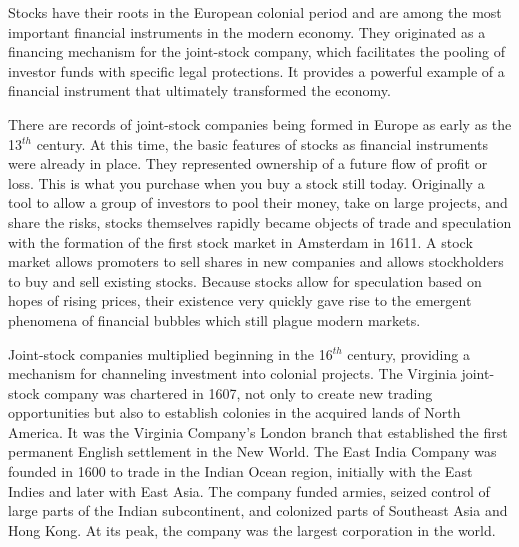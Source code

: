 Stocks have their roots in the European colonial period and are among the most important financial instruments in the modern economy. %
They originated as a financing mechanism for the \gls{joint-stock company},  
which facilitates the pooling of investor funds with specific legal protections. It provides a powerful example of a financial instrument that ultimately transformed the economy. 

There are records of joint-stock companies being formed in Europe as early as the 13$^{th}$ century. At this time, the basic features of stocks as financial instruments were already in place. They represented ownership of a future flow of profit or loss. This is what you purchase when you buy a stock still today. Originally a tool to allow a group of investors to pool their money, take on large projects, and share the risks, stocks themselves rapidly became objects of trade and speculation with the formation of the first stock market in Amsterdam in 1611. 
A stock market allows promoters to sell shares in new companies and allows stockholders to buy and sell existing stocks. 
Because stocks allow for speculation based on hopes of rising prices, their existence very quickly gave rise to the emergent phenomena of financial bubbles which still plague modern markets. 




Joint-stock companies multiplied beginning in the 16$^{th}$ century, providing a mechanism for channeling investment into colonial projects. The Virginia joint-stock company was chartered in 1607, not only to create new trading opportunities but also to establish colonies in the acquired lands of North America.  It was the Virginia Company's London branch that established the first permanent English settlement in the New World. The East India Company was founded in 1600 to trade in the Indian Ocean region, initially with the East Indies and later with East Asia. The company funded armies, seized control of large parts of the Indian subcontinent, and colonized parts of Southeast Asia and Hong Kong. At its peak, the company was the largest corporation in the world. 

